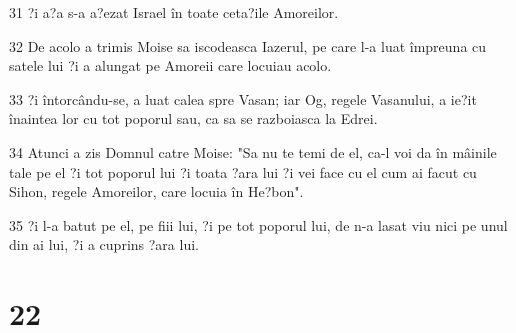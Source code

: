 \par 31 ?i a?a s-a a?ezat Israel în toate ceta?ile Amoreilor.
\par 32 De acolo a trimis Moise sa iscodeasca Iazerul, pe care l-a luat împreuna cu satele lui ?i a alungat pe Amoreii care locuiau acolo.
\par 33 ?i întorcându-se, a luat calea spre Vasan; iar Og, regele Vasanului, a ie?it înaintea lor cu tot poporul sau, ca sa se razboiasca la Edrei.
\par 34 Atunci a zis Domnul catre Moise: "Sa nu te temi de el, ca-l voi da în mâinile tale pe el ?i tot poporul lui ?i toata ?ara lui ?i vei face cu el cum ai facut cu Sihon, regele Amoreilor, care locuia în He?bon".
\par 35 ?i l-a batut pe el, pe fiii lui, ?i pe tot poporul lui, de n-a lasat viu nici pe unul din ai lui, ?i a cuprins ?ara lui.

\chapter{22}

